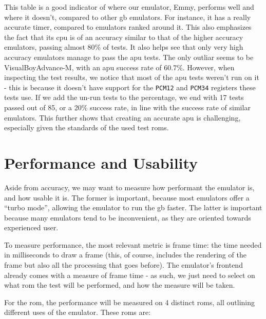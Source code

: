 \documentclass[11pt]{report}
\begin{document}
This table is a good indicator of where our emulator, Emmy, performs well and where it doesn't, compared to other \gls{gb} emulators. For instance, it has a really accurate timer, compared to emulators ranked around it. This also emphasizes the fact that its \gls{cpu} is of an accuracy similar to that of the higher accuracy emulators, passing almost 80\% of tests. It also helps see that only very high accuracy emulators manage to pass the \gls{apu} tests. The only outliar seems to be VisualBoyAdvance-M, with an \gls{apu} success rate of 60.7\%. However, when inspecting the test results, we notice that most of the \gls{apu} tests weren't run on it - this is because it doesn't have support for the \texttt{PCM12} and \texttt{PCM34} registers these tests use. If we add the un-run tests to the percentage, we end with 17 tests passed out of 85, or a 20\% success rate, in line with the success rate of similar emulators. This further shows that creating an accurate \gls{apu} is challenging, especially given the standards of the used test \glspl{rom}.

\section{Performance and Usability}

Aside from accuracy, we may want to measure how performant the emulator is, and how usable it is. The former is important, because most emulators offer a ``turbo mode'', allowing the emulator to run the \gls{gb} faster. The latter is important because many emulators tend to be inconvenient, as they are oriented towards experienced user.

To measure performance, the most relevant metric is frame time: the time needed in milliseconds to draw a frame (this, of course, includes the rendering of the frame but also all the processing that goes before). The emulator's frontend already comes with a measure of frame time - as such, we just need to select on what \gls{rom} the test will be performed, and how the measure will be taken.

For the \gls{rom}, the performance will be measured on 4 distinct \glspl{rom}, all outlining different uses of the emulator. These \glspl{rom} are:
\end{document}
